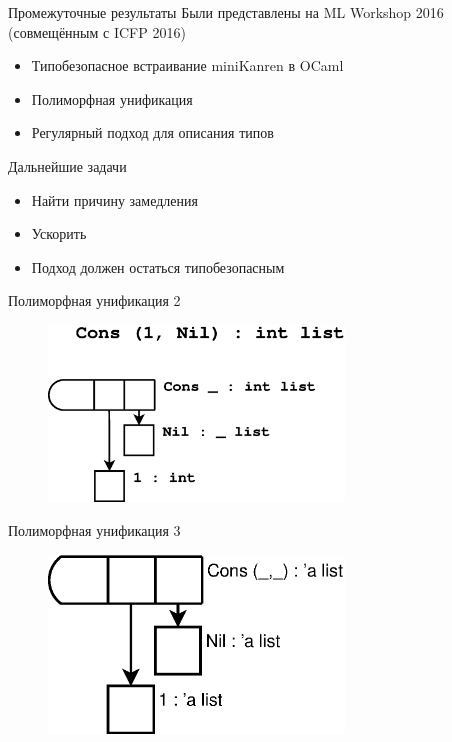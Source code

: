 \documentclass[10pt, mathserif]{beamer}
\theoremstyle{definition}
\begin{document}
\begin{frame}[fragile]{Промежуточные результаты}
Были представлены на ML Workshop 2016 (совмещённым с ICFP 2016)
\begin{itemize}
\item Типобезопасное встраивание miniKanren в OCaml
\item Полиморфная унификация
\item Регулярный подход для описания типов
\end{itemize}

\end{frame}

{

}

\begin{frame}[fragile]{Дальнейшие задачи}
  \begin{itemize}
  \item Найти причину замедления
  \item Ускорить
  \item Подход должен остаться типобезопасным
  \end{itemize}

\end{frame}


\begin{frame}[fragile]{Полиморфная унификация 2}

\begin{figure}
\centering
\includegraphics[width=0.7\textwidth]{img0.eps}
\end{figure}

\end{frame}

\begin{frame}[fragile]{Полиморфная унификация 3}

\begin{figure}
\centering
\includegraphics[width=0.7\textwidth]{img1.eps}
\end{figure}

\end{frame}
\end{document}
